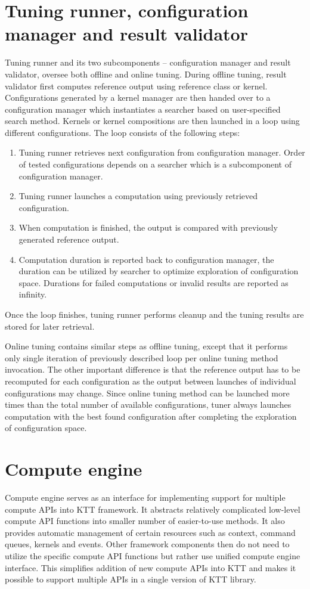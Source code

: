 \documentclass
[
    digital, %
    oneside, %
    table, %
    nolof, %
    nolot, %
    nocover %
]{fithesis3}
\begin{document}
\section{Tuning runner, configuration manager and result validator}
Tuning runner and its two subcomponents -- configuration manager and result validator, oversee both offline and online tuning. During offline tuning,
result validator first computes reference output using reference class or kernel. Configurations generated by a kernel manager are then handed over to
a configuration manager which instantiates a searcher based on user-specified search method. Kernels or kernel compositions are then launched in a loop
using different configurations. The loop consists of the following steps:
\begin{enumerate}
    \item Tuning runner retrieves next configuration from configuration manager. Order of tested configurations depends on a searcher which is
    a subcomponent of configuration manager.
    \item Tuning runner launches a computation using previously retrieved configuration.
    \item When computation is finished, the output is compared with previously generated reference output.
    \item Computation duration is reported back to configuration manager, the duration can be utilized by searcher to optimize exploration of
    configuration space. Durations for failed computations or invalid results are reported as infinity.
\end{enumerate}
Once the loop finishes, tuning runner performs cleanup and the tuning results are stored for later retrieval.

Online tuning contains similar steps as offline tuning, except that it performs only single iteration of previously described loop per online tuning
method invocation. The other important difference is that the reference output has to be recomputed for each configuration as the output between
launches of individual configurations may change. Since online tuning method can be launched more times than the total number of available configurations,
tuner always launches computation with the best found configuration after completing the exploration of configuration space.

\section{Compute engine}
Compute engine serves as an interface for implementing support for multiple compute APIs into KTT framework. It abstracts relatively complicated
low-level compute API functions into smaller number of easier-to-use methods. It also provides automatic management of certain resources such as context,
command queues, kernels and events. Other framework components then do not need to utilize the specific compute API functions but rather use unified
compute engine interface. This simplifies addition of new compute APIs into KTT and makes it possible to support multiple APIs in a single version of
KTT library.
\end{document}
